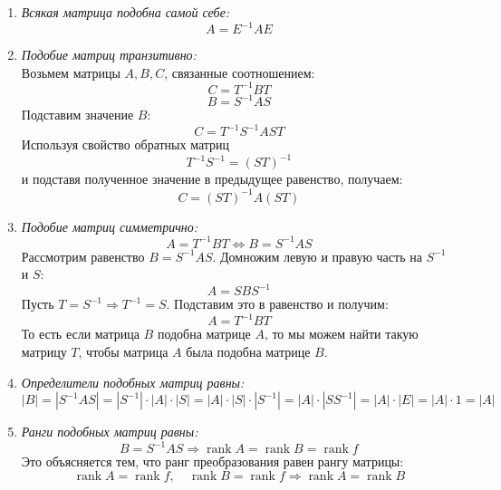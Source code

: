 \documentclass[a4paper, 12pt]{article}
\newcommand{\rank}{\operatorname{rank}}
\begin{document}
    \begin{enumerate}
        \item \textit{Всякая матрица подобна самой себе:}
        $$A=E^{-1}AE$$
        \item \textit{Подобие матриц транзитивно:}\\
        Возьмем матрицы $A, B, C$, связанные соотношением:
        $$C=T^{-1}BT$$
        $$B=S^{-1}AS$$
        Подставим значение $B$:
        $$C=T^{-1}S^{-1}AST$$
        Используя свойство обратных матриц
        $$T^{-1}S^{-1}=(ST)^{-1}$$
        и подставя полученное значение в предыдущее равенство, получаем:
        $$C=(ST)^{-1}A(ST)$$
        \item \textit{Подобие матриц симметрично:}
        $$A=T^{-1}BT \Leftrightarrow B=S^{-1}AS$$
        Рассмотрим равенство $B=S^{-1}AS$. Домножим левую и правую часть на $S^{-1}$ и $S$:
        $$A=SBS^{-1}$$
        Пусть $T=S^{-1} \Rightarrow T^{-1}=S$. Подставим это в равенство и получим:
        $$A=T^{-1}BT$$
        То есть если матрица $B$ подобна матрице $A$, то мы можем найти такую матрицу $T$, чтобы матрица $A$ была подобна матрице $B$.
        \item \textit{Определители подобных матриц равны:}
        $$|B|=|S^{-1}AS|=|S^{-1}|\cdot|A|\cdot|S|=|A|\cdot|S|\cdot|S^{-1}|=|A|\cdot|SS^{-1}|=|A|\cdot|E|=|A|\cdot1=|A|$$
        \item \textit{Ранги подобных матриц равны:}
        $$B=S^{-1}AS \Rightarrow \rank A = \rank B = \rank f$$
        Это объясняется тем, что ранг преобразования равен рангу матрицы:
        $$\rank A = \rank f, \quad \rank B = \rank f \Rightarrow \rank A = \rank B$$
    \end{enumerate}
\end{document}
